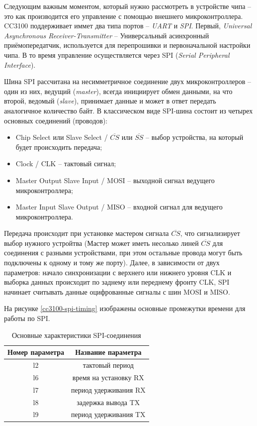 Следующим важным моментом, который нужно рассмотреть в устройстве
чипа -- это как производится его управление с помощью внешнего микроконтроллера.
CC3100 поддерживает иммет два типа портов -- \textit{UART} и \textit{SPI}.
Первый, \textit{Universal Asynchronous Receiver-Transmitter}\cite{uart} --
Универсальный асинхронный приёмопередатчик, используется для
перепрошивки и первоначальной настройки чипа. В то время
управление осуществляется через SPI (\textit{Serial Peripheral Interface})\cite{spi}.

Шина SPI рассчитана на несимметричное соединение двух микроконтроллеров -- один
из них, ведущий (\textit{master}), всегда инициирует обмен данными, на что второй,
ведомый (\textit{slave}), принимает данные и может в ответ
передать аналогичное количество байт. В классическом
виде SPI-шина состоит из четырех основных соединений (проводов):
\begin{itemize}
    \item Chip Select или Slave Select /  $\overline{CS}$ или $\overline{SS}$ -- выбор устройства,
    на который будет происходить передача;
    \item Clock / CLK -- тактовый сигнал;
    \item Master Output Slave Input / MOSI -- выходной сигнал ведущего микроконтроллера;
    \item Master Input Slave Output / MISO -- входной сигнал для ведущего микроконтроллера.
\end{itemize}

Передача происходит при установке мастером сигнала $\overline{CS}$,
что сигнализирует выбор нужного устройтва
(Мастер может иметь несолько линей $\overline{CS}$
для соединения с разными устройствами, при этом остальные провода
могут быть подключены к одному и тому же порту). Далее,
в зависимости от двух параметров: начало синхронизации
с верхнего или нижнего уровня CLK и выборка данных происходит
по заднему или переднему фронту CLK, SPI начинает считывать
данные оцифрованные сигналы с шин MOSI и MISO.

На рисунке \ref{cc3100-spi-timing} изображены основные промежутки
времени для работы по SPI.
\clearpage

\begin{table}[h]
\caption{Основные характеристики SPI-соединения}
\label{spi:timing}
\begin{center}
    \begin{tabular}{|c|c|}
        \hline
        Номер параметра & Название параметра \\ \hline
        l2 & тактовый период \\ \hline
        l6 & время на установку RX \\ \hline
        l7 & период удерживания RX\\ \hline
        l8 & задержка вывода TX \\ \hline
        l9 & период удерживания TX \\ \hline
    \end{tabular}
\end{center}
\end{table}

